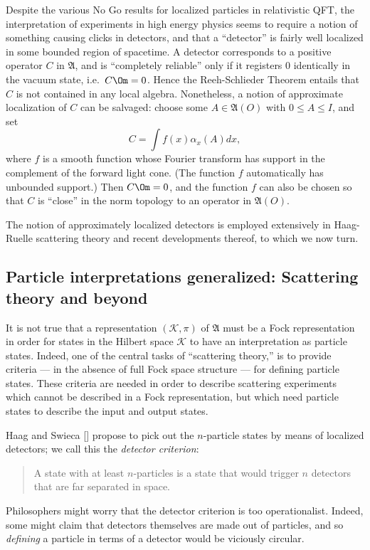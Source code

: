 \documentclass[12pt]{article}
\theoremstyle{definition}
\theoremstyle{definition}
\theoremstyle{remark}
\def\2#1{{\mathcal #1}}
\def\al#1{{\mathfrak #1}}
\def\a{\alpha} \def\b{\beta} \def\g{\gamma} \def\d{\delta}
\begin{document}
Despite the various No Go results for localized
particles in relativistic QFT, the interpretation of
experiments in high energy physics seems to require a
notion of something causing clicks in detectors, and
that a ``detector'' is fairly well localized in some
bounded region of spacetime.  A detector corresponds to
a positive operator $C$ in $\al A$, and is ``completely
reliable'' only if it registers $0$ identically in the
vacuum state, i.e.\ $C\Om =0$.  Hence the
Reeh-Schlieder Theorem entails that $C$ is not
contained in any local algebra.  Nonetheless, a notion
of approximate localization of $C$ can be salvaged:
choose some $A\in \al A (O)$ with $0\leq A\leq I$, and
set
$$ C =\int f(x)\a _x(A) dx ,$$
where $f$ is a smooth function whose Fourier transform has support in
the complement of the forward light cone.  (The function $f$
automatically has unbounded support.)  Then $C\Om =0$, and the
function $f$ can also be chosen so that $C$ is ``close'' in the norm
topology to an operator in $\al A(O)$.

The notion of approximately localized detectors is employed
extensively in Haag-Ruelle scattering theory and recent developments
thereof, to which we now turn.

\subsection{Particle interpretations generalized: Scattering theory
  and beyond} \label{scat}

It is not true that a representation $(\2K ,\pi )$ of $\al A$ must be
a Fock representation in order for states in the Hilbert space $\2K$
to have an interpretation as particle states.  Indeed, one of the
central tasks of ``scattering theory,'' is to provide criteria --- in
the absence of full Fock space structure --- for defining particle
states.  These criteria are needed in order to describe scattering
experiments which cannot be described in a Fock representation, but
which need particle states to describe the input and output states.

Haag and Swieca [\citeyear{haags}] propose to pick out the
$n$-particle states by means of localized detectors; we call this the
\emph{detector criterion}:
\begin{quote} A state with at least $n$-particles is a state that
  would trigger $n$ detectors that are far separated in space.
\end{quote} 
Philosophers might worry that the detector criterion is too
operationalist.  Indeed, some might claim that detectors themselves
are made out of particles, and so \emph{defining} a particle in terms
of a detector would be viciously circular.
\end{document}
